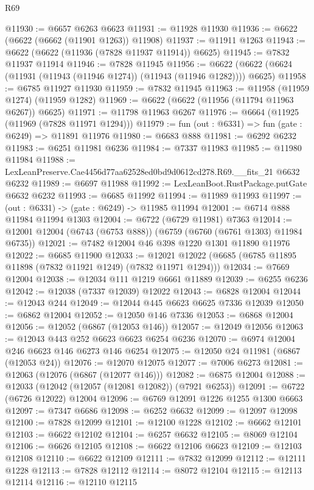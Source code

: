 \begin{lexlean}{R69}
\begin{coremodule}
{@11930 := @6657 @6263 @6623
@11931 := @11928 @11930
@11936 := @6622 (@6622 (@6662 (@11901 @1263)) @11908)
@11937 := @11911 @1263
@11943 := @6622 (@6622 (@11936 (@7828 @11937 @11914)) @6625)
@11945 := @7832 @11937 @11914
@11946 := @7828 @11945
@11956 := @6622 (@6622 (@6624 (@11931 (@11943 (@11946 @1274)) (@11943 (@11946 @1282)))) @6625)
@11958 := @6785 @11927 @11930
@11959 := @7832 @11945
@11963 := @11958 (@11959 @1274) (@11959 @1282)
@11969 := @6622 (@6622 (@11956 (@11794 @11963 @6267)) @6625)
@11971 := @11798 @11963 @6267
@11976 := @6664 (@11925 (@11969 (@7828 @11971 @1294)))
@11979 := fun (out : @6331) => fun (gate : @6249) => @11891 @11976
@11980 := @6683 @888
@11981 := @6292 @6232
@11983 := @6251 @11981 @6236
@11984 := @7337 @11983
@11985 := @11980 @11984
@11988 := LexLeanPreserve.Cae4456d77aa62528ed0bd9d0612cd278.R69.__fits_21 @6632 @6232
@11989 := @6697 @11988
@11992 := LexLeanBoot.RustPackage.putGate @6632 @6232
@11993 := @6685 @11992
@11994 := @11989 @11993
@11997 := (out : @6331) -> (gate : @6249) -> @11985 @11994
@12001 := @6714 @888 @11984 @11994 @1303
@12004 := @6722 (@6729 @11981) @7363
@12014 := @12001 @12004 (@6743 (@6753 @888)) (@6759 (@6760 (@6761 @1303) @11984 @6735))
@12021 := @7482 @12004 @46 @398 @1220 @1301 @11890 @11976
@12022 := @6685 @11900
@12033 := @12021 @12022 (@6685 (@6785 @11895 @11898 (@7832 @11921 @1249) (@7832 @11971 @1294)))
@12034 := @7669 @12004
@12038 := @12034 @111 @1219 @6661 @11889
@12039 := @6255 @6236
@12042 := @12038 (@7337 @12039) @12022
@12043 := @6828 @12004
@12044 := @12043 @244
@12049 := @12044 @445 @6623 @6625 @7336 @12039
@12050 := @6862 @12004
@12052 := @12050 @146 @7336
@12053 := @6868 @12004
@12056 := @12052 (@6867 (@12053 @146))
@12057 := @12049 @12056
@12063 := @12043 @443 @252 @6623 @6623 @6254 @6236
@12070 := @6974 @12004 @246 @6623 @146 @6273 @146 @6254
@12075 := @12050 @24 @11981 (@6867 (@12053 @24))
@12076 := @12070 @12075
@12077 := @7006 @6273
@12081 := @12063 (@12076 (@6867 (@12077 @146)))
@12082 := @6875 @12004
@12088 := @12033 (@12042 (@12057 (@12081 @12082)) (@7921 @6253))
@12091 := @6722 (@6726 @12022) @12004
@12096 := @6769 @12091 @1226 @1255 @1300 @6663
@12097 := @7347 @6686
@12098 := @6252 @6632
@12099 := @12097 @12098
@12100 := @7828 @12099
@12101 := @12100 @1228
@12102 := @6662 @12101
@12103 := @6622 @12102
@12104 := @6257 @6632
@12105 := @8069 @12104
@12106 := @6626 @12105
@12108 := @6622 @12106 @6623
@12109 := @12103 @12108
@12110 := @6622 @12109
@12111 := @7832 @12099
@12112 := @12111 @1228
@12113 := @7828 @12112
@12114 := @8072 @12104
@12115 := @12113 @12114
@12116 := @12110 @12115
}
\end{coremodule}
\end{lexlean}
